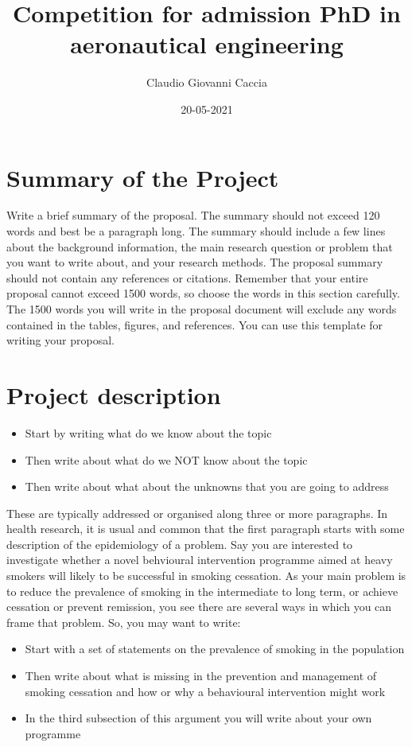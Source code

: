 \documentclass[a4paper]{article}
\title{Competition for admission PhD in \\ aeronautical engineering}
\author{Claudio Giovanni Caccia}
\date{20-05-2021}
\begin{document}
\maketitle

\section*{Summary of the Project}

Write a brief summary of the proposal. The summary should not exceed 120 words and best be a paragraph long. The summary should include a few lines about the background information, the main research question or problem that you want to write about, and your research methods. The proposal summary should not contain any references or citations. Remember that your entire proposal cannot exceed 1500 words, so choose the words in this section carefully. The 1500 words you will write in the proposal document will exclude any words contained in the tables, figures, and references. You can use this template for writing your proposal. 

\section*{Project description}




\begin{itemize}
\item Start by writing what do we know about the topic
\item Then write about what do we NOT know about the topic 
\item Then write about what about the unknowns that you are going to address
\end{itemize}

These are typically addressed or organised along three or more paragraphs. In health research, it is usual and common that the first paragraph starts with some description of the epidemiology of a problem. Say you are interested to investigate whether a novel behvioural intervention programme aimed at heavy smokers will likely to be successful in smoking cessation. As your main problem is to reduce the prevalence of smoking in the intermediate to long term, or achieve cessation or prevent remission, you see there are several ways in which you can frame that problem. So, you may want to write:

\begin{itemize}
\item Start with a set of statements on the prevalence of smoking in the population
\item Then write about what is missing in the prevention and management of smoking cessation and how or why a behavioural intervention might work
\item In the third subsection of this argument you will write about your own programme
\end{itemize}
\end{document}
